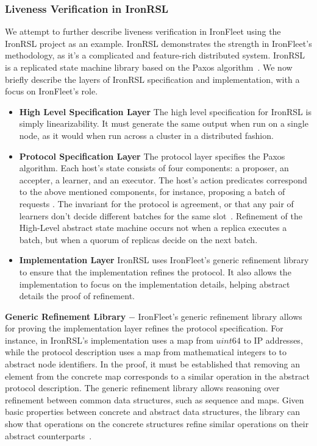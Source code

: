 \documentclass{llncs}
\begin{document}
\subsubsection{Liveness Verification in IronRSL}
We attempt to further describe liveness verification in IronFleet using the IronRSL project as 
an example. IronRSL demonstrates the strength in IronFleet's methodology, as it's a 
complicated and feature-rich distributed system. IronRSL is a replicated state machine library
based on the Paxos algorithm~\cite{paxos}. We now briefly describe the layers of IronRSL specification
and implementation, with a focus on IronFleet's role.
\begin{itemize}
\item \textbf{High Level Specification Layer} The high level specification for IronRSL is simply linearizability.
    It must generate the same output when run on a single node, as it would when run across a cluster in a 
    distributed fashion.

\item \textbf{Protocol Specification Layer} The protocol layer specifies the Paxos algorithm. Each host's state 
    consists of four components: a proposer, an accepter, a learner, and an executor. The host's action 
    predicates correspond to the above mentioned components, for instance, proposing a batch of requests 
    . The invariant for the protocol is agreement, or that any pair of learners don't 
    decide different batches for the same slot~\cite{ironfleet}. Refinement of the High-Level abstract state machine
    occurs not when a replica executes a batch, but when a quorum of replicas decide on the next batch.

\item \textbf{Implementation Layer} IronRSL uses IronFleet's generic refinement library to ensure that 
    the implementation refines the protocol. It also allows the implementation to focus on the implementation
    details, helping abstract details the proof of refinement.    

\end{itemize}


\textbf{Generic Refinement Library} $-$ IronFleet's generic refinement library allows for proving the implementation 
layer refines the protocol specification. For instance, in IronRSL's implementation uses a map from $uint64$ to 
IP addresses, while the protocol description uses a map from mathematical integers to to abstract node identifiers.
In the proof, it must be established that removing an element from the concrete map corresponds to a similar 
operation in the abstract protocol description. The generic refinement library allows reasoning over 
refinement between common data structures, such as sequence and maps. Given basic properties between concrete and
abstract data structures, the library can show that operations on the concrete structures refine similar operations
on their abstract counterparts~\cite{ironfleet}.
\end{document}
